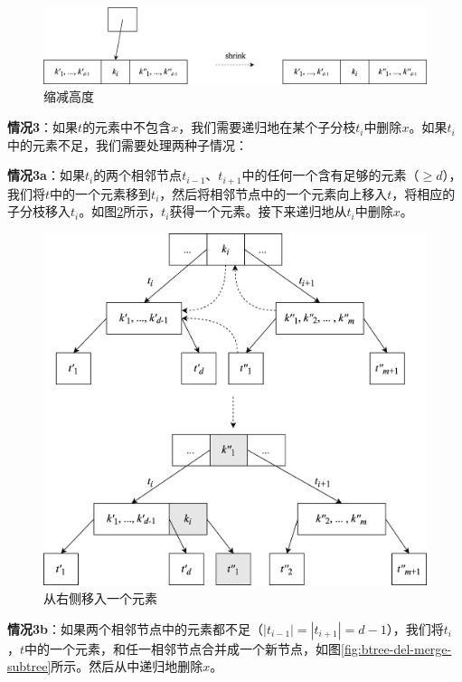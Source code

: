 \documentclass{ctexart}
\begin{document}
\begin{figure}[htbp]
  \centering
  \includegraphics[scale=0.65]{img/btree-del-shrink.png}
  \caption{缩减高度}
  \label{fig:btree-del-shrink}
\end{figure}

\textbf{情况3}：如果$t$的元素中不包含$x$，我们需要递归地在某个子分枝$t_i$中删除$x$。如果$t_i$中的元素不足，我们需要处理两种子情况：

\textbf{情况3a}：如果$t_i$的两个相邻节点$t_{i-1}$、$t_{i+1}$中的任何一个含有足够的元素（$\geq d$），我们将$t$中的一个元素移到$t_i$，然后将相邻节点中的一个元素向上移入$t$，将相应的子分枝移入$t_i$。如图\ref{fig:btree-del-borrow}所示，$t_i$获得一个元素。接下来递归地从$t_i$中删除$x$。

\begin{figure}[htbp]
  \centering
  \includegraphics[scale=0.65]{img/btree-del-borrow.png}
  \caption{从右侧移入一个元素}
  \label{fig:btree-del-borrow}
\end{figure}

\textbf{情况3b}：如果两个相邻节点中的元素都不足（$|t_{i-1}| = |t_{i+1}| = d - 1$），我们将$t_i$，$t$中的一个元素，和任一相邻节点合并成一个新节点，如图\ref{fig:btree-del-merge-subtree}所示。然后从中递归地删除$x$。
\end{document}
